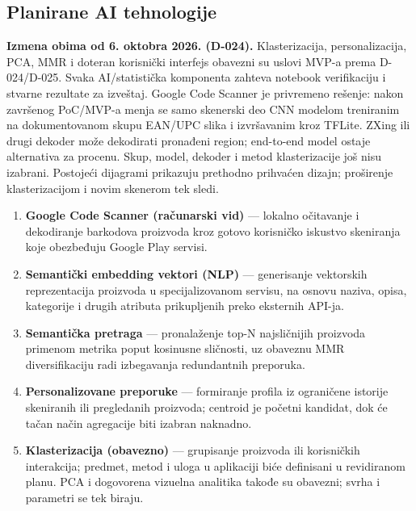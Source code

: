 \documentclass[12pt,a4paper]{article}
\begin{document}
\subsection{Planirane AI tehnologije}

\textbf{Izmena obima od 6. oktobra 2026. (D-024).} Klasterizacija, personalizacija, PCA, MMR i doteran korisnički interfejs obavezni su uslovi MVP-a prema D-024/D-025. Svaka AI/statistička komponenta zahteva notebook verifikaciju i stvarne rezultate za izveštaj. Google Code Scanner je privremeno rešenje: nakon završenog PoC/MVP-a menja se samo skenerski deo CNN modelom treniranim na dokumentovanom skupu EAN/UPC slika i izvršavanim kroz TFLite. ZXing ili drugi dekoder može dekodirati pronađeni region; end-to-end model ostaje alternativa za procenu. Skup, model, dekoder i metod klasterizacije još nisu izabrani. Postojeći dijagrami prikazuju prethodno prihvaćen dizajn; proširenje klasterizacijom i novim skenerom tek sledi.

\begin{enumerate}
  \item \textbf{Google Code Scanner (računarski vid)} --- lokalno očitavanje i dekodiranje barkodova proizvoda kroz gotovo korisničko iskustvo skeniranja koje obezbeđuju Google Play servisi.

  \item \textbf{Semantički embedding vektori (NLP)} --- generisanje vektorskih reprezentacija proizvoda u specijalizovanom servisu, na osnovu naziva, opisa, kategorije i drugih atributa prikupljenih preko eksternih API-ja.

  \item \textbf{Semantička pretraga} --- pronalaženje top-N najsličnijih proizvoda primenom metrika poput kosinusne sličnosti, uz obaveznu MMR diversifikaciju radi izbegavanja redundantnih preporuka.

  \item \textbf{Personalizovane preporuke} --- formiranje profila iz ograničene istorije skeniranih ili pregledanih proizvoda; centroid je početni kandidat, dok će tačan način agregacije biti izabran naknadno.

  \item \textbf{Klasterizacija (obavezno)} --- grupisanje proizvoda ili korisničkih interakcija; predmet, metod i uloga u aplikaciji biće definisani u revidiranom planu. PCA i dogovorena vizuelna analitika takođe su obavezni; svrha i parametri se tek biraju.
\end{enumerate}
\end{document}
